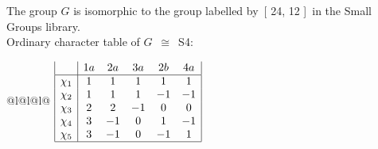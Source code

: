 \documentclass[varwidth=\maxdimen,border=10]{standalone}
\begin{document}
The group $G$ is isomorphic to the group labelled by\ [ 24, 12 ]\ in the Small Groups library.\\
Ordinary character table of $G$\ $\cong$\ S4:\\
\begin{center}
\begin{tabular}{@{}l@{}l@{}l@{}}
\hline
\(\begin{array}{|l|ccccc|}
  & 1a & 2a & 3a & 2b & 4a\\ \hline
\chi_{1} & 1 & 1 & 1 & 1 & 1\\
\chi_{2} & 1 & 1 & 1 & -1 & -1\\
\chi_{3} & 2 & 2 & -1 & 0 & 0\\
\chi_{4} & 3 & -1 & 0 & 1 & -1\\
\chi_{5} & 3 & -1 & 0 & -1 & 1\\
\hline
\end{array}\)\\
\end{tabular}
\end{center}
\end{document}
